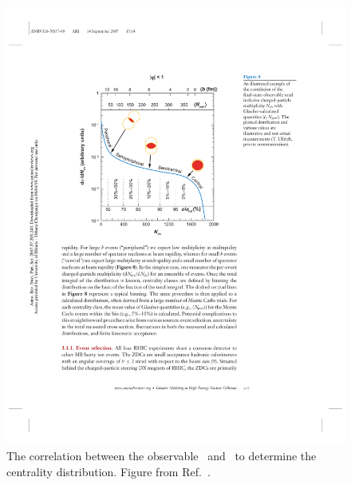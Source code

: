 \begin{figure}
\begin{center}
\begin{minipage}[b]{0.4\textwidth}
\includegraphics[width=\textwidth]{figures/theory/cent_estimate}
\caption{The correlation between the observable \Nch\ and \Npart\ to determine the centrality distribution.
Figure from Ref.~\cite{doi:10.1146/annurev.nucl.57.090506.123020}.}
\label{fig:cent_estimate}
  \end{minipage}
  \end{center}
\end{figure}





